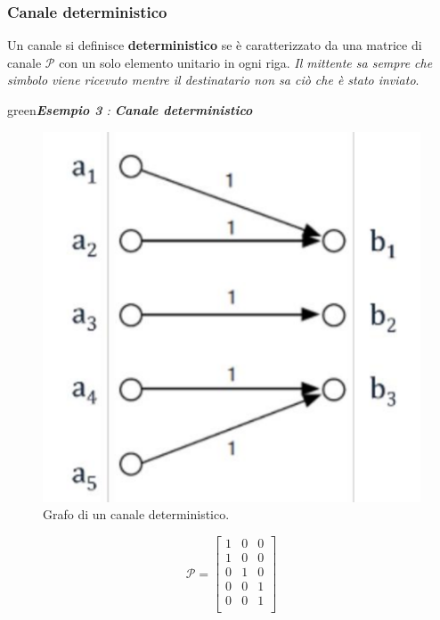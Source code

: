 \subsubsection{Canale deterministico}
Un canale si definisce \textbf{deterministico} se è caratterizzato da una matrice di canale $\mathcal{P}$ con un solo elemento
unitario in ogni riga. \textit{Il mittente sa sempre che simbolo viene ricevuto mentre il destinatario non sa ci\`o che \`e stato inviato}.
\begin{mybox}{green}{\textit{\textbf{Esempio 3} : \textbf{Canale deterministico}}}
\begin{minipage}{0.45\textwidth}
\begin{figure}[H]
    \centering
    \includegraphics[scale=0.2]{img/determ.png}
    \caption{Grafo di un canale deterministico.}
\end{figure}
\end{minipage}
\begin{minipage}{0.45\textwidth}
\begin{equation*}
    \mathcal{P} = \begin{bmatrix}
    1 & 0 & 0 \\
    1 & 0 & 0 \\
    0 & 1 & 0 \\
    0 & 0 & 1 \\
    0 & 0 & 1 \\
    \end{bmatrix}
\end{equation*}
\end{minipage}
\end{mybox}
